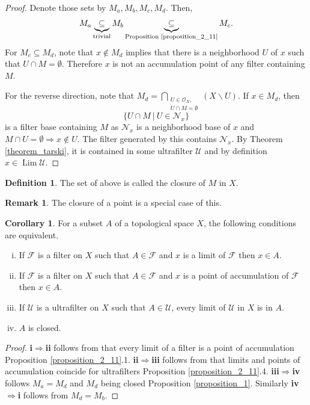 \documentclass[10pt]{article}
\numberwithin{equation}{section}
\theoremstyle{definition}
\newtheorem{definition}{Definition}[subsection]
\newtheorem{remark}{Remark}[subsection]
\newtheorem{corollary}{Corollary} [subsection]
\DeclareMathOperator{\Lim}{Lim}
\newcommand{\Ouv}{\mathscr{O}}
\newcommand{\F}[0]{\mathcal{F}}
\newcommand{\U}[0]{\mathcal{U}}
\newcommand{\sep}[0]{\:|\:}
\begin{document}
\begin{proof}
    Denote those sets by $M_a,M_b,M_c,M_d$. Then,
    \begin{equation*}
        M_a\underbrace{\subseteq}_{\text{trivial}}M_b\underbrace{\subseteq}_{\text{Proposition \ref{proposition_2_11}}} M_c.
    \end{equation*}
    For $M_c\subseteq M_d$, note that $x\not\in M_d$ implies that there is a neighborhood $U$ of $x$ such that $U\cap M=\emptyset$. Therefore $x$ is not an accumulation point of any filter containing $M$.
    \par For the reverse direction, note that $M_d = \bigcap_{\substack{U\in\Ouv_X,\\U\cap M=\emptyset}}(X\backslash U)$. If $x\in M_d$, then
    \begin{equation*}
        \{U\cap M\sep U\in\mathcal{N}_x\}
    \end{equation*}
    is a filter base containing $M$ as $\mathcal{N}_x$ is a neighborhood base of $x$ and $M\cap U=\emptyset\Rightarrow x\not\in U$. The filter generated by this contains $\mathcal{N}_x$. By Theorem \ref{theorem_tarski}, it is contained in some ultrafilter $\mathcal{U}$ and by definition $x\in\Lim\mathcal{U}$.
\end{proof}
\begin{definition}
    \label{definition_10}
    The set of above is called the closure of $M$ in $X$.
\end{definition}
\begin{remark}
    \label{remark_2}
    The closure of a point is a special case of this.
\end{remark}
\begin{corollary}
    \label{corollary_1}
    For a subset $A$ of a topological space $X$, the following conditions are equivalent.
    \begin{enumerate}[i.]
        \item If $\F$ is a filter on $X$ such that $A\in\F$ and $x$ is a limit of $\F$ then $x\in A$.
        \item If $\F$ is a filter on $X$ such that $A\in\F$ and $x$ is a point of accumulation of $\F$ then $x\in A$.
        \item If $\mathcal{U}$ is a ultrafilter on $X$ such that $A\in\mathcal{U}$, every limit of $\mathcal{U}$ in $X$ is in $A$.
        \item $A$ is closed.
    \end{enumerate}
\end{corollary}
\begin{proof}
    \textbf{i}$\Rightarrow$\textbf{ii} follows from that every limit of a filter is a point of accumulation Proposition \ref{proposition_2_11}.1. \textbf{ii}$\Rightarrow$\textbf{iii} follows from that limits and points of accumulation coincide for ultrafilters Proposition \ref{proposition_2_11}.4. \textbf{iii}$\Rightarrow$\textbf{iv} follows $M_a=M_d$ and $M_d$ being closed Proposition \ref{proposition_1}. Similarly \textbf{iv}$\Rightarrow$\textbf{i} follows from $M_d = M_b$.
\end{proof}
\end{document}
